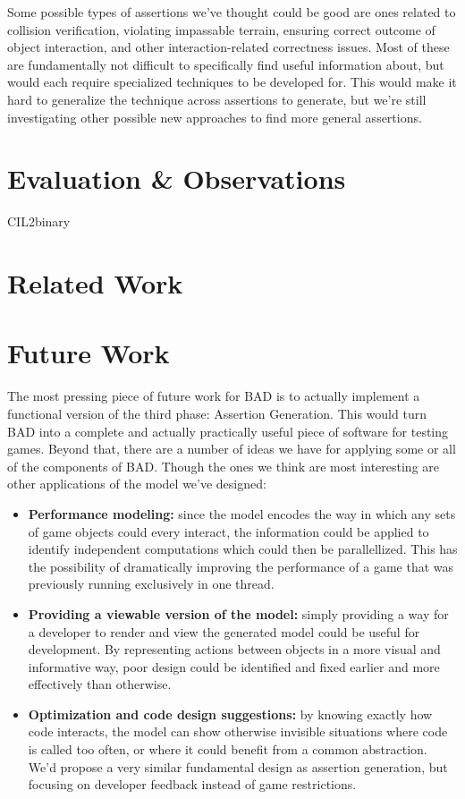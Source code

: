 \documentclass[letterpaper,twocolumn,10pt]{article}
\begin{document}
Some possible types of assertions we've thought could be good are ones related to collision verification, violating impassable terrain, ensuring correct outcome of object interaction, and other interaction-related correctness issues. Most of these are fundamentally not difficult to specifically find useful information about, but would each require specialized techniques to be developed for. This would make it hard to generalize the technique across assertions to generate, but we're still investigating other possible new approaches to find more general assertions.

\section{Evaluation \& Observations}
CIL2binary

\section{Related Work}

\section{Future Work}

The most pressing piece of future work for BAD is to actually implement a functional version of the third phase: Assertion Generation. This would turn BAD into a complete and actually practically useful piece of software for testing games. Beyond that, there are a number of ideas we have for applying some or all of the components of BAD. Though the ones we think are most interesting are other applications of the model we've designed:

\begin{itemize}
    \item{\textbf{Performance modeling:}} since the model encodes the way in which any sets of game objects could every interact, the information could be applied to identify independent computations which could then be parallellized. This has the possibility of dramatically improving the performance of a game that was previously running exclusively in one thread.  
    \item {\textbf{Providing a viewable version of the model:}} simply providing a way for a developer to render and view the generated model could be useful for development. By representing actions between objects in a more visual and informative way, poor design could be identified and fixed earlier and more effectively than otherwise.
    \item{\textbf{Optimization and code design suggestions:}} by knowing exactly how code interacts, the model can show otherwise invisible situations where code is called too often, or where it could benefit from a common abstraction. We'd propose a very similar fundamental design as assertion generation, but focusing on developer feedback instead of game restrictions.
\end{itemize}
\end{document}
